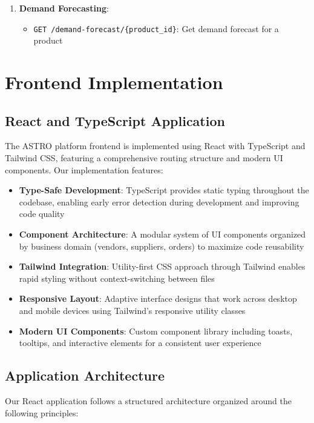 \begin{enumerate}
    \item \textbf{Demand Forecasting}:
          \begin{itemize}
              \item \texttt{GET /demand-forecast/\{product\_id\}}: Get demand forecast for a product
          \end{itemize}
\end{enumerate}

\section{Frontend Implementation}

\subsection{React and TypeScript Application}

The ASTRO platform frontend is implemented using React with TypeScript and Tailwind CSS, featuring a comprehensive routing structure and modern UI components. Our implementation features:

\begin{itemize}
    \item \textbf{Type-Safe Development}: TypeScript provides static typing throughout the codebase, enabling early error detection during development and improving code quality
    \item \textbf{Component Architecture}: A modular system of UI components organized by business domain (vendors, suppliers, orders) to maximize code reusability
    \item \textbf{Tailwind Integration}: Utility-first CSS approach through Tailwind enables rapid styling without context-switching between files
    \item \textbf{Responsive Layout}: Adaptive interface designs that work across desktop and mobile devices using Tailwind's responsive utility classes
    \item \textbf{Modern UI Components}: Custom component library including toasts, tooltips, and interactive elements for a consistent user experience
\end{itemize}

\subsection{Application Architecture}

Our React application follows a structured architecture organized around the following principles:

